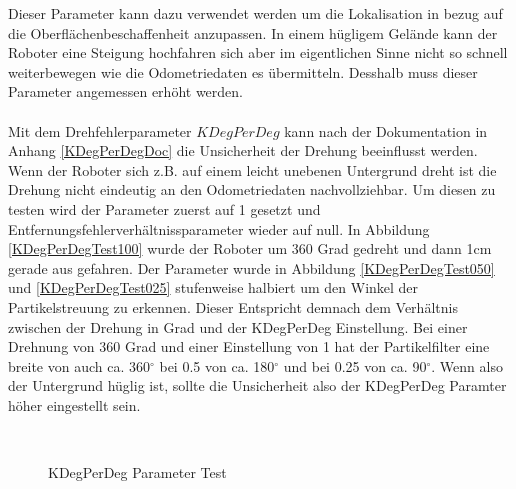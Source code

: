 \documentclass{article}
\begin{document}
Dieser Parameter kann dazu verwendet werden um die Lokalisation in bezug auf die Oberfl\"achenbeschaffenheit anzupassen. In einem h\"ugligem Gel\"ande kann der Roboter eine Steigung hochfahren sich aber im eigentlichen Sinne nicht so schnell weiterbewegen wie die Odometriedaten es \"ubermitteln. Desshalb muss dieser Parameter angemessen erh\"oht werden.
\\ \\
Mit dem Drehfehlerparameter $KDegPerDeg$ kann nach der Dokumentation in Anhang \ref{KDegPerDegDoc} die Unsicherheit der Drehung beeinflusst werden. Wenn der Roboter sich z.B. auf einem leicht unebenen Untergrund dreht ist die Drehung nicht eindeutig an den Odometriedaten nachvollziehbar. 
Um diesen zu testen wird der Parameter zuerst auf 1 gesetzt und Entfernungsfehlerverh\"altnissparameter wieder auf null.
In Abbildung \ref{KDegPerDegTest100} wurde der Roboter um 360 Grad gedreht und dann 1cm gerade aus gefahren. Der Parameter wurde in Abbildung \ref{KDegPerDegTest050} und \ref{KDegPerDegTest025} stufenweise halbiert um den Winkel der Partikelstreuung zu erkennen. Dieser Entspricht demnach dem Verh\"altnis zwischen der Drehung in Grad und der KDegPerDeg Einstellung. Bei einer Drehnung von 360 Grad und einer Einstellung von 1 hat der Partikelfilter eine breite von auch ca. 360$^\circ$ bei 0.5 von ca. 180$^\circ$ und bei 0.25 von ca. 90$^\circ$. Wenn also der Untergrund h\"uglig ist, sollte die Unsicherheit also der KDegPerDeg Paramter h\"oher eingestellt sein. 


\begin{figure}
  \centering
  \ 
  \ 
  \caption{KDegPerDeg Parameter Test}
  \label{KDegPerDegTestFigure}
\end{figure}
\end{document}
